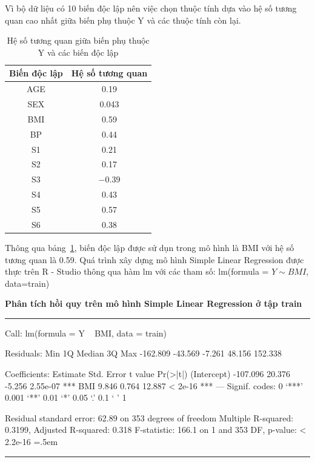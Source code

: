 \documentclass[runningheads]{llncs}
\newenvironment{lcverbatim}
 {\SaveVerbatim{cverb}}
 {\endSaveVerbatim
  \flushleft\fboxrule=0pt\fboxsep=.5em
  \colorbox{cverbbg}{%
    \makebox[\dimexpr\linewidth-2\fboxsep][l]{\BUseVerbatim{cverb}}%
  }
  \endflushleft
}
\begin{document}
Vì bộ dữ liệu có 10 biến độc lập nên việc chọn thuộc tính dựa vào hệ số tương quan cao nhất giữa biến phụ thuộc Y và các thuộc tính còn lại. 

\begin{table}[H]
	\setlength{\tabcolsep}{0.5em}
	\renewcommand{\arraystretch}{1.4}
	\begin{center}
		\caption{Hệ số tương quan giữa biến phụ thuộc Y và các biến độc lập}\label{tab3}
		\begin{tabular}{|c|c|}
			\hline
			Biến độc lập&Hệ số tương quan\\
			\hline
			AGE&0.19\\
			\hline
			SEX&0.043\\
			\hline
			BMI&0.59\\
			\hline
			BP&	0.44\\
			\hline
			S1&	0.21\\
			\hline
			S2&0.17\\
			\hline
			S3&$-0.39$\\
			\hline
			S4&0.43\\
			\hline
			S5&0.57\\
			\hline
			S6&0.38\\
			\hline
		\end{tabular}			
	\end{center}
\end{table}
Thông qua bảng~\ref{tab3}, biến độc lập được sử dụn trong mô hình là BMI với hệ số tương quan là 0.59. Quá trình xây dựng mô hình Simple Linear Regression được thực trên R - Studio thông qua hàm lm với các tham số:  lm(formula = $Y \sim BMI$, data=train)

\vspace{0.5cm}
\textbf{Phân tích hồi quy trên mô hình Simple Linear Regression ở tập train}
\vspace{0.5cm}
\hrule
\begin{lcverbatim}
Call:
lm(formula = Y ~ BMI, data = train)

Residuals:
     Min       1Q   Median       3Q      Max 
-162.809  -43.569   -7.261   48.156  152.338 

Coefficients:
            Estimate Std. Error t value Pr(>|t|)    
(Intercept) -107.096     20.376  -5.256 2.55e-07 ***
BMI            9.846      0.764  12.887  < 2e-16 ***
---
Signif. codes:  0 ‘***’ 0.001 ‘**’ 0.01 ‘*’ 0.05 ‘.’ 0.1 ‘ ’ 1

Residual standard error: 62.89 on 353 degrees of freedom
Multiple R-squared:  0.3199,	Adjusted R-squared:  0.318 
F-statistic: 166.1 on 1 and 353 DF,  p-value: < 2.2e-16
\end{lcverbatim}
\hrule
\vspace{0.5cm}
\end{document}
